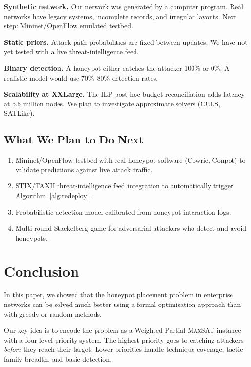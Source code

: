 \documentclass[journal]{IEEEtran}
\newcommand{\maxsat}{\textsc{MaxSAT}}
\begin{document}
\textbf{Synthetic network.}
Our network was generated by a computer program.
Real networks have legacy systems, incomplete records, and
irregular layouts.
Next step: Mininet/OpenFlow emulated testbed.

\textbf{Static priors.}
Attack path probabilities are fixed between updates.
We have not yet tested with a live threat-intelligence feed.

\textbf{Binary detection.}
A honeypot either catches the attacker 100\% or 0\%.
A realistic model would use 70\%--80\% detection rates.

\textbf{Scalability at XXLarge.}
The ILP post-hoc budget reconciliation adds latency at
5.5 million nodes.
We plan to investigate approximate solvers (CCLS, SATLike).

\subsection{What We Plan to Do Next}

\begin{enumerate}
  \item Mininet/OpenFlow testbed with real honeypot software
        (Cowrie, Conpot) to validate predictions against live
        attack traffic.
  \item STIX/TAXII threat-intelligence feed integration to
        automatically trigger Algorithm~\ref{alg:redeploy}.
  \item Probabilistic detection model calibrated from
        honeypot interaction logs.
  \item Multi-round Stackelberg game for adversarial
        attackers who detect and avoid honeypots.
\end{enumerate}

\section{Conclusion}
\label{sec:conclusion}

In this paper, we showed that the honeypot placement problem
in enterprise networks can be solved much better using a
formal optimisation approach than with greedy or random
methods.

Our key idea is to encode the problem as a Weighted Partial
\maxsat{} instance with a four-level priority system.
The highest priority goes to catching attackers
\emph{before} they reach their target.
Lower priorities handle technique coverage, tactic family
breadth, and basic detection.
\end{document}
